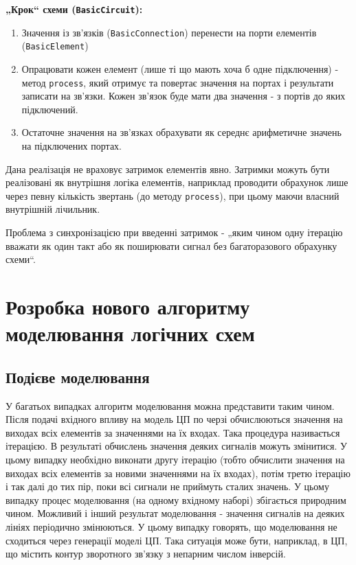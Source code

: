 \documentclass[12pt,a4paper]{article}
\begin{document}
\textbf{„Крок“ схеми (\lstinline$BasicCircuit$):}
\begin{enumerate}
  \item Значення із зв’язків (\lstinline$BasicConnection$) перенести на порти елементів (\lstinline$BasicElement$)
  \item Опрацювати кожен елемент (лише ті що мають хоча б одне підключення) - метод \lstinline$process$, який отримує та повертає значення на портах і результати записати на зв’язки. Кожен зв’язок буде мати два значення - з портів до яких підключений.
  \item Остаточне значення на зв’язках обрахувати як середнє арифметичне значень на підключених портах.
\end{enumerate}

Дана реалізація не враховує затримок елементів явно. Затримки можуть бути реалізовані як внутрішня логіка елементів, наприклад проводити обрахунок лише через певну кількість звертань (до методу \lstinline$process$), при цьому маючи власний внутрішній лічильник.

Проблема з синхронізацією при введенні затримок - „яким чином одну ітерацію вважати як один такт або як поширювати сигнал без багаторазового обрахунку схеми“.

\clearpage

\section{Розробка нового алгоритму моделювання логічних схем}

\subsection{Подієве моделювання}

У багатьох випадках алгоритм моделювання можна представити таким чином. Після подачі вхідного впливу на модель ЦП по черзі обчислюються значення на виходах всіх елементів за значеннями на їх входах. Така процедура називається ітерацією. В результаті обчислень значення деяких сигналів можуть змінитися. У цьому випадку необхідно виконати другу ітерацію (тобто обчислити значення на виходах всіх елементів за новими значеннями на їх входах), потім третю ітерацію і так далі до тих пір, поки всі сигнали не приймуть сталих значень. У цьому випадку процес моделювання (на одному вхідному наборі) збігається природним чином. Можливий і інший результат моделювання - значення сигналів на деяких лініях періодично змінюються. У цьому випадку говорять, що моделювання не сходиться через генерації моделі ЦП. Така ситуація може бути, наприклад, в ЦП, що містить контур зворотного зв'язку з непарним числом інверсій.
\end{document}
